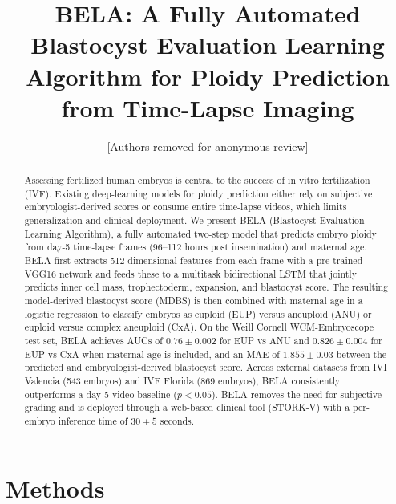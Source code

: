 \documentclass[10pt]{article}
\title{BELA: A Fully Automated Blastocyst Evaluation Learning Algorithm for
Ploidy Prediction from Time-Lapse Imaging}
\author{[Authors removed for anonymous review]}
\date{}
\begin{document}
\maketitle

\begin{abstract}
Assessing fertilized human embryos is central to the success of in vitro
fertilization (IVF). Existing deep-learning models for ploidy prediction either
rely on subjective embryologist-derived scores or consume entire time-lapse
videos, which limits generalization and clinical deployment. We present BELA
(Blastocyst Evaluation Learning Algorithm), a fully automated two-step model
that predicts embryo ploidy from day-5 time-lapse frames (96--112 hours post
insemination) and maternal age. BELA first extracts 512-dimensional features
from each frame with a pre-trained VGG16 network and feeds these to a multitask
bidirectional LSTM that jointly predicts inner cell mass, trophectoderm,
expansion, and blastocyst score. The resulting model-derived blastocyst score
(MDBS) is then combined with maternal age in a logistic regression to classify
embryos as euploid (EUP) versus aneuploid (ANU) or euploid versus complex
aneuploid (CxA). On the Weill Cornell WCM-Embryoscope test set, BELA achieves
AUCs of $0.76 \pm 0.002$ for EUP vs ANU and $0.826 \pm 0.004$ for EUP vs CxA
when maternal age is included, and an MAE of $1.855 \pm 0.03$ between the
predicted and embryologist-derived blastocyst score. Across external datasets
from IVI Valencia (543 embryos) and IVF Florida (869 embryos), BELA
consistently outperforms a day-5 video baseline ($p < 0.05$). BELA removes the
need for subjective grading and is deployed through a web-based clinical tool
(STORK-V) with a per-embryo inference time of $30 \pm 5$ seconds.
\end{abstract}





\section{Methods}
\end{document}
